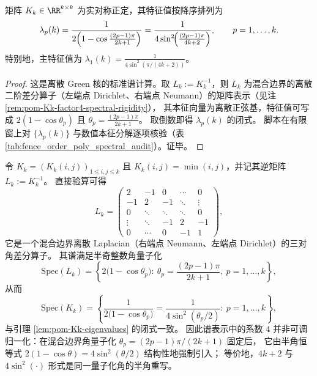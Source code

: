 \begin{lemma}[\texorpdfstring{\(K_k(i,j)=\min(i,j)\)}{K_k(i,j)=min(i,j)} 的完全谱闭式]\label{lem:pom-Kk-eigenvalues}
矩阵 \(K_k\in\RR^{k\times k}\) 为实对称正定，其特征值按降序排列为
\[
\lambda_p(k)=\frac{1}{2\Bigl(1-\cos\frac{(2p-1)\pi}{2k+1}\Bigr)}
=\frac{1}{4\sin^2\!\Bigl(\frac{(2p-1)\pi}{4k+2}\Bigr)},
\qquad p=1,\dots,k.
\]
特别地，主特征值为
\(
\lambda_1(k)=\frac{1}{4\sin^2(\pi/(4k+2))}
\)。
\end{lemma}
\begin{proof}
这是离散 Green 核的标准谱计算。取 \(L_k:=K_k^{-1}\)，则 \(L_k\) 为混合边界的离散二阶差分算子（左端点 Dirichlet、右端点 Neumann）的矩阵表示（见注 \ref{rem:pom-Kk-factor4-spectral-rigidity}），
其本征向量为离散正弦基，特征值可写成 \(2(1-\cos\theta_p)\) 且 \(\theta_p=\frac{(2p-1)\pi}{2k+1}\)。
取倒数即得 \(\lambda_p(k)\) 的闭式。
脚本在有限窗上对 \(\{\lambda_p(k)\}\) 与数值本征分解逐项核验（表 \ref{tab:fence_order_poly_spectral_audit}）。证毕。
\end{proof}



\begin{remark}\label{rem:pom-Kk-factor4-spectral-rigidity}
令 \(K_k=(K_k(i,j))_{1\le i,j\le k}\) 且 \(K_k(i,j)=\min(i,j)\)，并记其逆矩阵 \(L_k:=K_k^{-1}\)。
直接验算可得
\[
L_k=
\begin{pmatrix}
2 & -1 & 0 & \cdots & 0\\
-1 & 2 & -1 & \ddots & \vdots\\
0 & \ddots & \ddots & \ddots & 0\\
\vdots & \ddots & -1 & 2 & -1\\
0 & \cdots & 0 & -1 & 1
\end{pmatrix},
\]
它是一个混合边界离散 Laplacian（右端点 Neumann、左端点 Dirichlet）的三对角差分算子。
其谱满足半奇整数角量子化
\[
\mathrm{Spec}(L_k)=
\left\{
2\bigl(1-\cos\theta_p\bigr):\ 
\theta_p=\frac{(2p-1)\pi}{2k+1},\ p=1,\dots,k
\right\},
\]
从而
\[
\mathrm{Spec}(K_k)=
\left\{
\frac{1}{2\bigl(1-\cos\theta_p\bigr)}
=
\frac{1}{4\sin^2(\theta_p/2)}:\ p=1,\dots,k
\right\},
\]
与引理 \ref{lem:pom-Kk-eigenvalues} 的闭式一致。
因此谱表示中的系数 \(4\) 并非可调归一化：在混合边界角量子化 \(\theta_p=(2p-1)\pi/(2k+1)\) 固定后，
它由半角恒等式 \(2(1-\cos\theta)=4\sin^2(\theta/2)\) 结构性地强制引入；
等价地，\(4k+2\) 与 \(4\sin^2(\cdot)\) 形式是同一量子化角的半角重写。
\end{remark}

